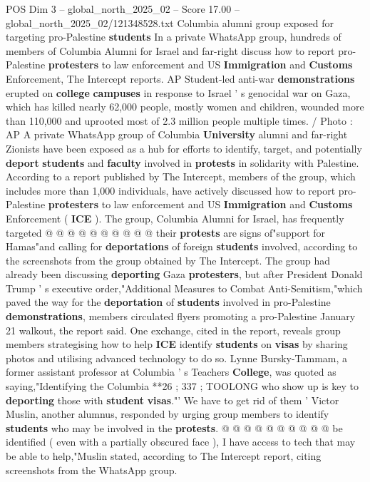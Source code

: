 \begin{textsample}{POS Dim 3 – global\_north\_2025\_02 – Score 17.00 – global\_north\_2025\_02/121348528.txt}  \label{ex:f3_pos_283}
Columbia alumni group exposed for targeting pro-Palestine \textbf{students} In a private WhatsApp group, hundreds of members of Columbia Alumni for Israel and far-right discuss how to report pro-Palestine \textbf{protesters} to law enforcement and US \textbf{Immigration} and \textbf{Customs} Enforcement, The Intercept reports.
AP Student-led anti-war \textbf{demonstrations} erupted on \textbf{college} \textbf{campuses} in response to Israel ' s genocidal war on Gaza, which has killed nearly 62,000 people, mostly women and children, wounded more than 110,000 and uprooted most of 2.3 million people multiple times. / Photo : AP A private WhatsApp group of Columbia \textbf{University} alumni and far-right Zionists have been exposed as a hub for efforts to identify, target, and potentially \textbf{deport} \textbf{students} and \textbf{faculty} involved in \textbf{protests} in solidarity with Palestine.
According to a report published by The Intercept, members of the group, which includes more than 1,000 individuals, have actively discussed how to report pro-Palestine \textbf{protesters} to law enforcement and US \textbf{Immigration} and \textbf{Customs} Enforcement ( \textbf{ICE} ).
The group, Columbia Alumni for Israel, has frequently targeted @ @ @ @ @ @ @ @ @ @ their \textbf{protests} are signs of"support for Hamas"and calling for \textbf{deportations} of foreign \textbf{students} involved, according to the screenshots from the group obtained by The Intercept.
The group had already been discussing \textbf{deporting} Gaza \textbf{protesters}, but after President Donald Trump ' s executive order,"Additional Measures to Combat Anti-Semitism,"which paved the way for the \textbf{deportation} of \textbf{students} involved in pro-Palestine \textbf{demonstrations}, members circulated flyers promoting a pro-Palestine January 21 walkout, the report said.
One exchange, cited in the report, reveals group members strategising how to help \textbf{ICE} identify \textbf{students} on \textbf{visas} by sharing photos and utilising advanced technology to do so.
Lynne Bursky-Tammam, a former assistant professor at Columbia ' s Teachers \textbf{College}, was quoted as saying,"Identifying the Columbia **26 ; 337 ; TOOLONG who show up is key to \textbf{deporting} those with \textbf{student} \textbf{visas}."' We have to get rid of them ' Victor Muslin, another alumnus, responded by urging group members to identify \textbf{students} who may be involved in the \textbf{protests}. @ @ @ @ @ @ @ @ @ @ be identified ( even with a partially obscured face ), I have access to tech that may be able to help,"Muslin stated, according to The Intercept report, citing screenshots from the WhatsApp group.

\end{textsample}
